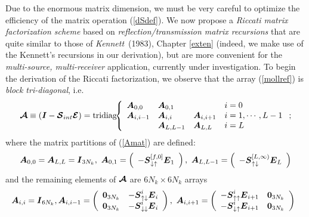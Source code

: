 Due to the enormous matrix dimension, we must be very careful to optimize the efficiency of the matrix 
operation (\ref{dSdef}). We now propose a {\em Riccati matrix factorization 
scheme\/} based on {\em reflection/transmission matrix recursions\/} that 
are quite similar to those of {\em Kennett\/}~(1983), Chapter 
\ref{exten} (indeed, we 
make use of the Kennett's recursions in our derivation), but are 
more convenient for the {\em multi-source, multi-receiver\/} application, 
currently under investigation.   
To begin the derivation of the Riccati factorization, we observe 
that the array (\ref{mollref}) is {\em block tri-diagonal\/}, i.e.
\begin{equation} \label{Amat}
{\mbox{\boldmath$\cal A$\unboldmath}} \equiv ({\mbox{\boldmath$\mit I$\unboldmath}}-{\mbox{\boldmath$\cal S$\unboldmath}}_{{int}}{\mbox{\boldmath$\cal E$\unboldmath}}) = 
\mbox{tridiag}\!\! \left\{{\begin{array}{llll}{\mbox{\boldmath$\mit A$\unboldmath}}_{0,0}&{\mbox{\boldmath$\mit A$\unboldmath}}_{0,1}&&i=0\\
{\mbox{\boldmath$\mit A$\unboldmath}}_{i,i-1}&{\mbox{\boldmath$\mit A$\unboldmath}}_{i,i}&{\mbox{\boldmath$\mit A$\unboldmath}}_{i,i+1}&i=1,\cdots ,L-1\\
&{\mbox{\boldmath$\mit A$\unboldmath}}_{L,L-1}&{\mbox{\boldmath$\mit A$\unboldmath}}_{L,L}&i=L\end{array}}\right. ;
\end{equation}
where the matrix partitions of (\ref{Amat}) are defined:
\begin{equation} 
{\mbox{\boldmath$\mit A$\unboldmath}}_{ 0, 0}={\mbox{\boldmath$\mit A$\unboldmath}}_{ L, L}= {\mbox{\boldmath$\mit I$\unboldmath}}_{3 N_k} , 
\ {\mbox{\boldmath$\mit A$\unboldmath}}_{ 0, 1}=
\left(\begin{array}{c} -{\mbox{\boldmath$\mit S$\unboldmath}}^{[f,0]}_{\downarrow\uparrow 
} {\mbox{\boldmath$\mit E$\unboldmath}}_{1}\end{array}\right),
\
{\mbox{\boldmath$\mit A$\unboldmath}}_{  L,L-1}=
\left(\begin{array}{c} 
-{\mbox{\boldmath$\mit S$\unboldmath}}^{[L,\infty)}_{\uparrow\downarrow} {\mbox{\boldmath$\mit E$\unboldmath}}_{L}\end{array}\right)
\end{equation}
and the remaining elements of $\mbox{\boldmath$\cal A$\unboldmath}$ are $6 N_k\times 6 N_k$ arrays
\begin{equation}
\!\!\! 
{\bmi  A}_{ i, i}= {\bmi  I}_{6 N_k} ,
{\bmi  A}_{i, i-1} =
\left({\begin{array}{cc} {\bf 0}_{3 N_k}&-{\bmi S}^{i}_{\uparrow 
\downarrow} {\bmi  E}_{i}\\ 
{\bf 0}_{3 N_k}&-{\bmi S}^{i}_{\downarrow\downarrow } {\bmi  E}_{i}
\end{array}}\right) , 
\ 
{\bmi  A}_{i, i+1}= \left({\begin{array}{cc} 
-{\bmi S}^{i}_{\uparrow \uparrow
} {\bmi  E}_{i+1}&{\bf 0}_{3 N_k}\\ -{\bmi S}^{i}_{\downarrow\uparrow 
} {\bmi  E}_{i+1}&{\bf 0}_{3 N_k}\end{array}}\right) 
\end{equation}
